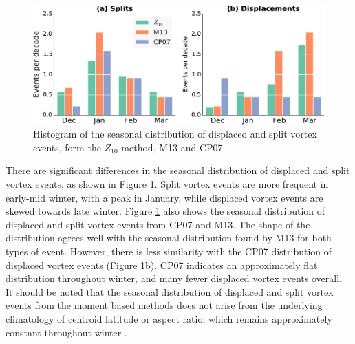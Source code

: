  \begin{figure}
 \centering
 \noindent\includegraphics[width=\textwidth]{figures/chapter-moments/splits_displacements_histogram.pdf}
 \caption[Seasonal distribution of dispalaced and split vortex
 events.]{Histogram of the seasonal distribution of displaced and split vortex
   events, form the $Z_{10}$ method, M13 and CP07.}
 \label{Fig2}
 \end{figure}
 There are significant differences in the seasonal distribution of displaced and
 split vortex events, as shown in Figure \ref{Fig2}. Split vortex events are
 more frequent in early-mid winter, with a peak in January, while displaced
 vortex events are skewed towards late winter. Figure \ref{Fig2} also shows the
 seasonal distribution of displaced and split vortex events from CP07 and
 M13. The shape of the distribution agrees well with the seasonal distribution
 found by M13 for both types of event. However, there is less similarity with
 the CP07 distribution of displaced vortex events (Figure \ref{Fig2}b). CP07
 indicates an approximately flat distribution throughout winter, and many fewer
 displaced vortex events overall. It should be noted that the seasonal
 distribution of displaced and split vortex events from the moment based methods
 does not arise from the underlying climatology of centroid latitude or aspect
 ratio, which remains approximately constant throughout winter
 \citep{Mitchell2011}.

